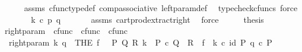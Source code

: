 \begin{isabellebody}
\ \ \ \ \isamarkupfalse%
\ assms\ cfunc{\isacharunderscore}{\kern0pt}type{\isacharunderscore}{\kern0pt}def\ comp{\isacharunderscore}{\kern0pt}associative\ left{\isacharunderscore}{\kern0pt}param{\isacharunderscore}{\kern0pt}def{}\ \isamarkupfalse%
\ {\isacharparenleft}{\kern0pt}typecheck{\isacharunderscore}{\kern0pt}cfuncs{\isacharcomma}{\kern0pt}\ force{\isacharparenright}{\kern0pt}\isanewline
\ \ \isamarkupfalse%
\ \isamarkupfalse%
\ {\isachardoublequoteopen}{\isachardot}{\kern0pt}{\isachardot}{\kern0pt}{\isachardot}{\kern0pt}\ {\isacharequal}{\kern0pt}\ k\ {\isasymcirc}\isactrlsub c\ {\isasymlangle}p{\isacharcomma}{\kern0pt}\ q{\isasymrangle}{\isachardoublequoteclose}\isanewline
\ \ \ \ \isamarkupfalse%
\ \ assms{\isacharparenleft}{\kern0pt}{}{\isacharcomma}{\kern0pt}{}{\isacharparenright}{\kern0pt}\ cart{\isacharunderscore}{\kern0pt}prod{\isacharunderscore}{\kern0pt}extract{\isacharunderscore}{\kern0pt}right\ \isamarkupfalse%
\ force\isanewline
\ \ \isamarkupfalse%
\ \isamarkupfalse%
\ {\isacharquery}{\kern0pt}thesis\isacommand{{\isachardot}{\kern0pt}}\isamarkupfalse%
\isanewline
{}\isamarkupfalse%
%
\endisatagproof
{\isafoldproof}%
%
\isadelimproof
\isanewline
%
\endisadelimproof
\isanewline
{}\isamarkupfalse%
\ right{\isacharunderscore}{\kern0pt}param\ {\isacharcolon}{\kern0pt}{\isacharcolon}{\kern0pt}\ {\isachardoublequoteopen}cfunc\ {\isasymRightarrow}\ cfunc\ {\isasymRightarrow}\ cfunc{\isachardoublequoteclose}\ {\isacharparenleft}{\kern0pt}{\isachardoublequoteopen}{\isacharunderscore}{\kern0pt}\isactrlbsub {\isacharbrackleft}{\kern0pt}{\isacharminus}{\kern0pt}{\isacharcomma}{\kern0pt}{\isacharunderscore}{\kern0pt}{\isacharbrackright}{\kern0pt}\isactrlesub {\isachardoublequoteclose}\ {\isacharbrackleft}{\kern0pt}{}{}{}{\isacharcomma}{\kern0pt}{}{\isacharbrackright}{\kern0pt}{}{}{}{\isacharparenright}{\kern0pt}\ \isanewline
\ \ {\isachardoublequoteopen}right{\isacharunderscore}{\kern0pt}param\ k\ q\ {\isasymequiv}\ {\isacharparenleft}{\kern0pt}THE\ f{\isachardot}{\kern0pt}\ \ {\isasymexists}\ P\ Q\ R{\isachardot}{\kern0pt}\ k\ {\isacharcolon}{\kern0pt}\ P\ {\isasymtimes}\isactrlsub c\ Q\ {\isasymrightarrow}\ R\ {\isasymand}\ f\ {\isacharequal}{\kern0pt}\ k\ {\isasymcirc}\isactrlsub c\ {\isasymlangle}id\ P{\isacharcomma}{\kern0pt}\ q\ {\isasymcirc}\isactrlsub c\ {\isasymbeta}\isactrlbsub P\isactrlesub {\isasymrangle}{\isacharparenright}{\kern0pt}{\isachardoublequoteclose}\isanewline

\end{isabellebody}

